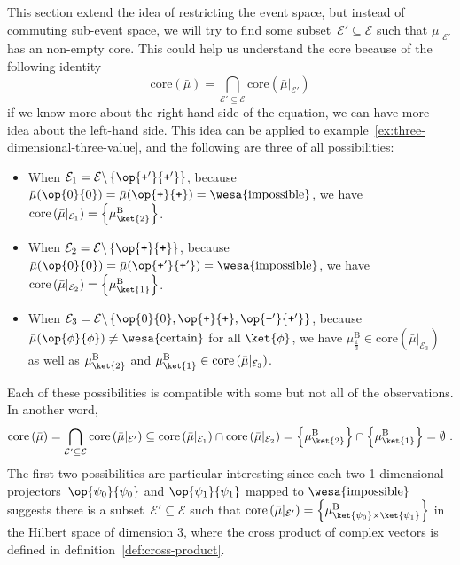 \documentclass[12pt]{iopart}
\theoremstyle{plain}
\theoremstyle{definition}
\theoremstyle{remark}
\newcommand{\events}{\ensuremath{\mathcal{E}}}
\newcommand{\imposs}{{\mbox{\wesa{impossible}}}}
\newcommand{\necess}{{\mbox{\wesa{certain}}}}
\newcommand{\proj}[1]{\op{#1}{#1}}
\newcommand{\ps}{\texttt{+}}
\begin{document}
This section extend the idea of restricting the event space, but instead
of commuting sub-event space, we will try to find some subset~$\events'\subseteq\events$
such that $\bar{\mu}|_{\events'}$ has an non-empty core. This could
help us understand the core because of the following identity
\begin{equation}
\mathrm{core}\left(\bar{\mu}\right)=\bigcap_{\events'\subseteq\events}\mathrm{core}\left(\bar{\mu}|_{\events'}\right)\label{eq:core-intersection}
\end{equation}
if we know more about the right-hand side of the equation, we can
have more idea about the left-hand side. This idea can be applied
to example~\ref{ex:three-dimensional-three-value}, and the following
are three of all possibilities:
\begin{itemize}
\item When $\events_{1}=\events\backslash\left\{ \proj{\ps'}\right\} $,
because $\bar{\mu}(\proj{0})=\bar{\mu}(\proj{\ps})=\imposs$, we have
$\mathrm{core}\left(\bar{\mu}|_{\events_{1}}\right)=\left\{ \mu_{\ket{2}}^{\mathrm{B}}\right\} $.
\item When $\events_{2}=\events\backslash\left\{ \proj{\ps}\right\} $,
because $\bar{\mu}(\proj{0})=\bar{\mu}(\proj{\ps'})=\imposs$, we
have $\mathrm{core}\left(\bar{\mu}|_{\events_{2}}\right)=\left\{ \mu_{\ket{1}}^{\mathrm{B}}\right\} $.
\item When $\events_{3}=\events\backslash\left\{ \proj{0},\proj{\ps},\proj{\ps'}\right\} $,
because $\bar{\mu}(\proj{\phi})\ne\necess$ for all $\ket{\phi}$,
we have $\mu_{\frac{\mathbb{1}}{3}}^{\mathrm{B}}\in\mathrm{core}\left(\bar{\mu}|_{\events_{3}}\right)$
as well as $\mu_{\ket{2}}^{\mathrm{B}}$ and $\mu_{\ket{1}}^{\mathrm{B}}\in\mathrm{core}\left(\bar{\mu}|_{\events_{3}}\right)$.
\end{itemize}
Each of these possibilities is compatible with some but not all of
the observations. In another word, 
\begin{equation}
\mathrm{core}\left(\bar{\mu}\right)=\bigcap_{\events'\subseteq\events}\mathrm{core}\left(\bar{\mu}|_{\events'}\right)\subseteq\mathrm{core}\left(\bar{\mu}|_{\events_{1}}\right)\cap\mathrm{core}\left(\bar{\mu}|_{\events_{2}}\right)=\left\{ \mu_{\ket{2}}^{\mathrm{B}}\right\} \cap\left\{ \mu_{\ket{1}}^{\mathrm{B}}\right\} =\emptyset\textrm{ .}
\end{equation}
The first two possibilities are particular interesting since each
two 1-dimensional projectors~$\proj{\psi_{0}}$ and $\proj{\psi_{1}}$
mapped to $\imposs$ suggests there is a subset~$\events'\subseteq\events$
such that $\mathrm{core}\left(\bar{\mu}|_{\events'}\right)=\left\{ \mu_{\ket{\psi_{0}}\times\ket{\psi_{1}}}^{\mathrm{B}}\right\} $
in the Hilbert space of dimension 3, where the cross product of complex
vectors is defined in definition~\ref{def:cross-product}. 
\end{document}
